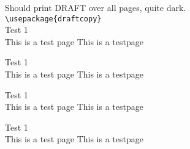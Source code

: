 \documentclass[a4paper]{article}
\newcommand{\xx}{
Test 1\\This is a test page \thepage \vfill
This is a testpage \thepage \newpage
}
\begin{document}
Should print DRAFT over all pages, quite dark.\\
\verb|\usepackage{draftcopy}|\\
\xx\xx\xx\xx
\end{document}
